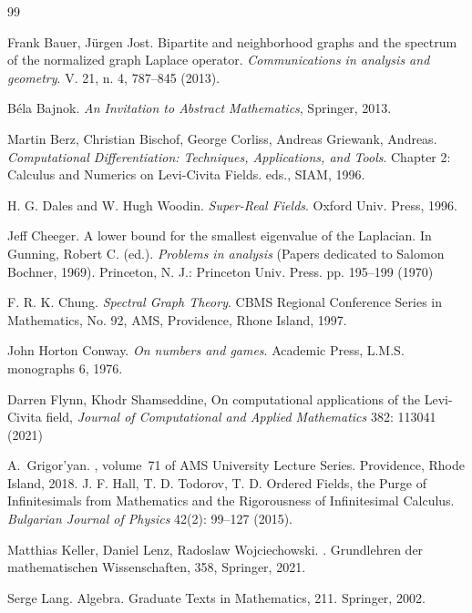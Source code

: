 \documentclass[a4paper,12pt]{amsart}
\theoremstyle{definition}
\begin{document}
\begin{thebibliography}{99}

Frank Bauer, J\"urgen Jost. Bipartite and neighborhood graphs and the
spectrum of the normalized graph Laplace operator. \emph{ Communications in analysis and geometry}. V. 21, n. 4, 787--845 (2013).

Béla Bajnok. \emph{An Invitation to Abstract Mathematics}, Springer, 2013.


 Martin Berz, Christian Bischof, George Corliss, Andreas Griewank, Andreas. {\em Computational Differentiation: Techniques, Applications, and Tools}. Chapter 2: Calculus and Numerics on Levi-Civita Fields. eds., SIAM, 1996.

	


H. G. Dales and W. Hugh Woodin. {\em Super-Real Fields}. Oxford Univ. Press, 1996.

Jeff Cheeger. A lower bound for the smallest eigenvalue of the Laplacian. In Gunning, Robert C. (ed.). \emph{ Problems in analysis }(Papers dedicated to Salomon Bochner, 1969). Princeton, N. J.: Princeton Univ. Press. pp. 195–199 (1970)

F. R. K. Chung. {\em Spectral Graph Theory}. CBMS Regional Conference Series in Mathematics, No. 92, AMS, Providence, Rhone Island, 1997.

John Horton Conway. \emph{On numbers and games}. Academic Press, L.M.S. monographs 6, 1976.

Darren Flynn, Khodr Shamseddine,
{On computational applications of the Levi-Civita field},
{\em Journal of Computational and Applied Mathematics} 382: 113041
(2021)

A.~Grigor'yan.
, volume~71 of AMS
  University Lecture Series.
\newblock Providence, Rhode Island, 2018. 
J. F. Hall, T. D. Todorov, T. D. Ordered Fields, the Purge of Infinitesimals from Mathematics and the Rigorousness of Infinitesimal Calculus. \emph{Bulgarian Journal of Physics} 42(2): 99--127 (2015).

Matthias Keller, Daniel Lenz, Radoslaw Wojciechowski. 
. Grundlehren der mathematischen Wissenschaften, 358, Springer, 2021. 


Serge Lang. Algebra. Graduate Texts in Mathematics, 211. Springer, 2002.


\end{thebibliography}
\end{document}
